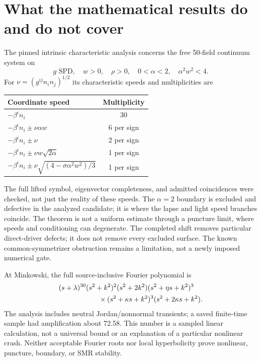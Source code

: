 \documentclass[11pt,letterpaper]{article}
\begin{document}
\section{What the mathematical results do and do not cover}
The pinned intrinsic characteristic analysis concerns the free 50-field continuum system on
\begin{equation}
g\text{ SPD},\quad w>0,\quad\rho>0,\quad0<\alpha<2,\quad\alpha^2w^2<4.
\end{equation}
For $\nu=(g^{ij}n_in_j)^{1/2}$ its characteristic speeds and multiplicities are
\begin{center}\begin{tabular}{lc}\toprule
Coordinate speed & Multiplicity\\\midrule
$-\beta^in_i$ & 30\\
$-\beta^in_i\pm\nu\alpha w$ & 6 per sign\\
$-\beta^in_i\pm\nu$ & 2 per sign\\
$-\beta^in_i\pm\nu w\sqrt{2\alpha}$ & 1 per sign\\
$-\beta^in_i\pm\nu\sqrt{(4-\sigma\alpha^2w^2)/3}$ & 1 per sign\\\bottomrule
\end{tabular}\end{center}
The full lifted symbol, eigenvector completeness, and admitted coincidences were checked, not just the reality of these speeds. The $\alpha=2$ boundary is excluded and defective in the analyzed candidate; it is where the lapse and light speed branches coincide. The theorem is not a uniform estimate through a puncture limit, where speeds and conditioning can degenerate. The completed shift removes particular direct-driver defects; it does not remove every excluded surface. The known common-symmetrizer obstruction remains a limitation, not a newly imposed numerical gate.

At Minkowski, the full source-inclusive Fourier polynomial is
\begin{align}
&(s+\lambda)^{30}(s^2+k^2)^2(s^2+2k^2)
(s^2+\eta s+k^2)^3\nonumber\\
&\hspace{20mm}\times(s^2+\kappa s+k^2)^3(s^2+2\kappa s+k^2).
\end{align}
The analysis includes neutral Jordan/nonnormal transients; a saved finite-time sample had amplification about 72.58. This number is a sampled linear calculation, not a universal bound or an explanation of a particular nonlinear crash. Neither acceptable Fourier roots nor local hyperbolicity prove nonlinear, puncture, boundary, or SMR stability.
\end{document}
